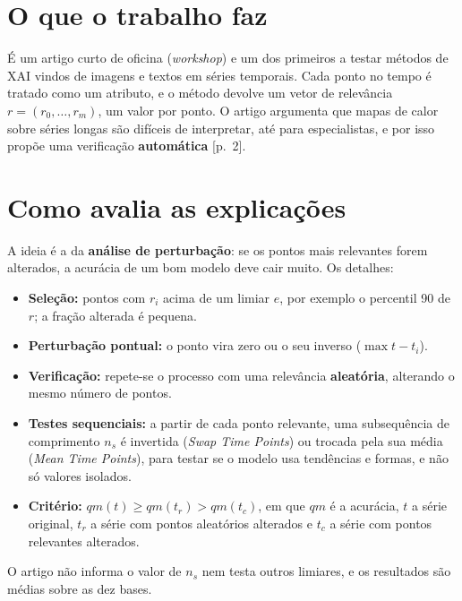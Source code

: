 \documentclass[11pt,a4paper]{article}
\begin{document}
\section{O que o trabalho faz}
É um artigo curto de oficina (\textit{workshop}) e um dos primeiros a testar métodos de XAI vindos de imagens e textos em séries temporais. Cada ponto no tempo é tratado como um atributo, e o método devolve um vetor de relevância $r = (r_0, \dots, r_m)$, um valor por ponto. O artigo argumenta que mapas de calor sobre séries longas são difíceis de interpretar, até para especialistas, e por isso propõe uma verificação \textbf{automática} [p.~2].

\section{Como avalia as explicações}
A ideia é a da \textbf{análise de perturbação}: se os pontos mais relevantes forem alterados, a acurácia de um bom modelo deve cair muito. Os detalhes:
\begin{itemize}
\item \textbf{Seleção:} pontos com $r_i$ acima de um limiar $e$, por exemplo o percentil 90 de $r$; a fração alterada é pequena.
\item \textbf{Perturbação pontual:} o ponto vira zero ou o seu inverso ($\max t - t_i$).
\item \textbf{Verificação:} repete-se o processo com uma relevância \textbf{aleatória}, alterando o mesmo número de pontos.
\item \textbf{Testes sequenciais:} a partir de cada ponto relevante, uma subsequência de comprimento $n_s$ é invertida (\textit{Swap Time Points}) ou trocada pela sua média (\textit{Mean Time Points}), para testar se o modelo usa tendências e formas, e não só valores isolados.
\item \textbf{Critério:} $qm(t) \geq qm(t_r) > qm(t_c)$, em que $qm$ é a acurácia, $t$ a série original, $t_r$ a série com pontos aleatórios alterados e $t_c$ a série com pontos relevantes alterados.
\end{itemize}
O artigo não informa o valor de $n_s$ nem testa outros limiares, e os resultados são médias sobre as dez bases.
\end{document}
